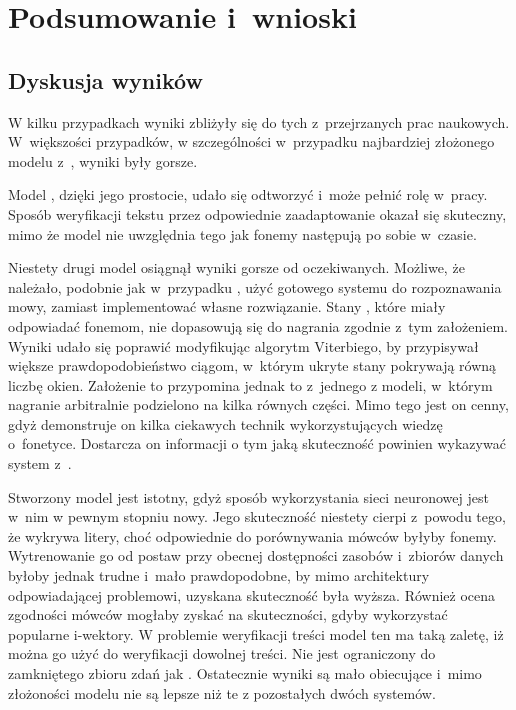 \chapter{Podsumowanie i~wnioski}\label{chap:podsumowanie}

\section{Dyskusja wyników}

W kilku przypadkach wyniki zbliżyły się do tych z~przejrzanych prac naukowych. W~większości przypadków,
w szczególności w~przypadku najbardziej złożonego modelu z~, wyniki były gorsze.

Model , dzięki jego prostocie, udało się odtworzyć i~może pełnić
rolę  w~pracy. Sposób weryfikacji tekstu przez odpowiednie zaadaptowanie 
okazał się skuteczny, mimo że model nie uwzględnia tego jak fonemy następują po sobie w~czasie.

Niestety drugi model  osiągnął wyniki gorsze od oczekiwanych.
Możliwe, że należało, podobnie jak w~przypadku , użyć gotowego systemu do rozpoznawania mowy,
zamiast implementować własne rozwiązanie.
Stany , które miały odpowiadać fonemom, nie dopasowują się do nagrania zgodnie z~tym założeniem.
Wyniki udało się poprawić modyfikując algorytm Viterbiego, by przypisywał większe prawdopodobieństwo
ciągom, w~którym ukryte stany pokrywają równą liczbę okien. Założenie to przypomina jednak to z~jednego
z modeli, w~którym nagranie arbitralnie podzielono na kilka równych części. Mimo tego jest on cenny,
gdyż demonstruje on kilka ciekawych technik wykorzystujących wiedzę o~fonetyce. Dostarcza on informacji
o tym jaką skuteczność powinien wykazywać system z~.

Stworzony model  jest istotny, gdyż sposób wykorzystania sieci neuronowej jest w~nim
w pewnym stopniu nowy. Jego skuteczność niestety cierpi z~powodu tego, że 
wykrywa litery, choć odpowiednie do porównywania mówców byłyby fonemy. Wytrenowanie go od postaw przy
obecnej dostępności zasobów i~zbiorów danych byłoby jednak trudne i~mało prawdopodobne, by mimo
architektury odpowiadającej problemowi, uzyskana skuteczność była wyższa.
Również ocena zgodności mówców mogłaby zyskać na skuteczności, gdyby wykorzystać popularne i-wektory.
W problemie weryfikacji treści model ten ma taką zaletę, iż można go użyć do weryfikacji
dowolnej treści. Nie jest ograniczony do zamkniętego zbioru zdań jak .
Ostatecznie wyniki są mało obiecujące i~mimo złożoności modelu nie są lepsze niż te
z pozostałych dwóch systemów.

